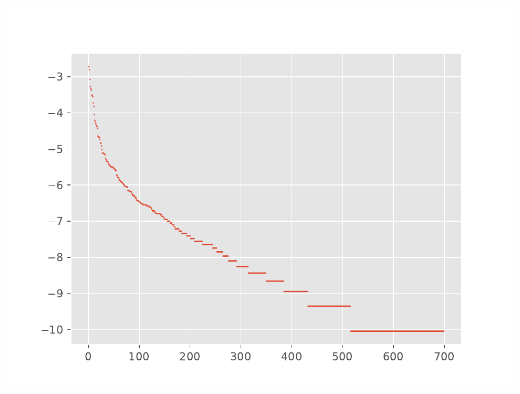 \documentclass[
]{article}
\begin{document}
\begin{center}\includegraphics[width=800\linewidth,height=600\linewidth]{VPscripts/Rank Abundance} \end{center}
\end{document}
